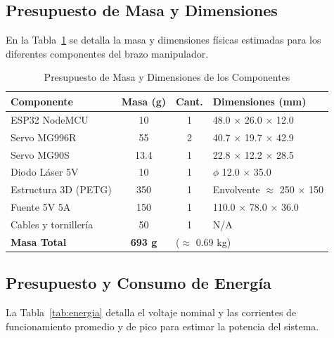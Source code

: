 \documentclass[conference,a4paper]{IEEEtran}
\newcommand{\tblsubhead}[1]{{\fontsize{7.5}{9}\selectfont #1}}
\begin{document}
\subsection{Presupuesto de Masa y Dimensiones}
En la Tabla~\ref{tab:masa_dimensiones} se detalla la masa y dimensiones físicas estimadas para los diferentes componentes del brazo manipulador.

\begin{table}[H]
\caption{Presupuesto de Masa y Dimensiones de los Componentes}
\begin{center}
\footnotesize
\begin{tabular}{l c c p{2.8cm}}
\toprule
\textbf{Componente} & \textbf{Masa} \tblsubhead{(g)} & \textbf{Cant.} & \textbf{Dimensiones} \tblsubhead{(mm)} \\
\midrule
ESP32 NodeMCU & 10 & 1 & 48.0 $\times$ 26.0 $\times$ 12.0 \\
Servo MG996R & 55 & 2 & 40.7 $\times$ 19.7 $\times$ 42.9 \\
Servo MG90S & 13.4 & 1 & 22.8 $\times$ 12.2 $\times$ 28.5 \\
Diodo Láser 5V & 10 & 1 & $\phi$ 12.0 $\times$ 35.0 \\
Estructura 3D (PETG) & 350 & 1 & Envolvente $\approx$ 250 $\times$ 150 \\
Fuente 5V 5A & 150 & 1 & 110.0 $\times$ 78.0 $\times$ 36.0 \\
Cables y tornillería & 50 & 1 & N/A \\
\midrule
\textbf{Masa Total} & \textbf{693 g} & \multicolumn{2}{l}{\tblsubhead{($\approx$ 0.69 kg)}} \\
\bottomrule
\end{tabular}
\label{tab:masa_dimensiones}
\end{center}
\end{table}

\subsection{Presupuesto y Consumo de Energía}
La Tabla~\ref{tab:energia} detalla el voltaje nominal y las corrientes de funcionamiento promedio y de pico para estimar la potencia del sistema.
\end{document}
